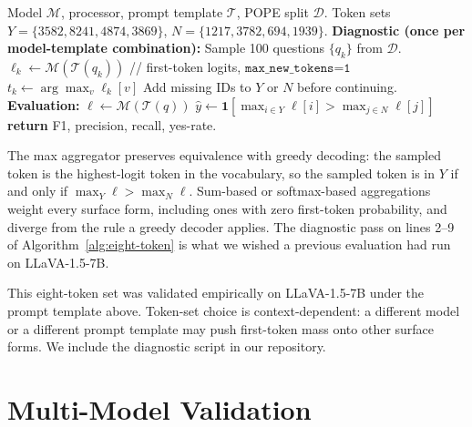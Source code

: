 \documentclass[11pt,letterpaper]{article}
\begin{document}
\begin{algorithm}[h]
\caption{Eight-token POPE read-out with new-model diagnostic.}
\label{alg:eight-token}
\begin{algorithmic}[1]
\REQUIRE Model $\mathcal{M}$, processor, prompt template $\mathcal{T}$, POPE split $\mathcal{D}$.
\REQUIRE Token sets $Y = \{3582, 8241, 4874, 3869\}$, $N = \{1217, 3782, 694, 1939\}$.
\STATE \textbf{Diagnostic (once per model-template combination):}
\STATE Sample 100 questions $\{q_k\}$ from $\mathcal{D}$.
  \STATE $\boldsymbol{\ell}_k \gets \mathcal{M}(\mathcal{T}(q_k))$ \quad // first-token logits, $\texttt{max\_new\_tokens=1}$
  \STATE $t_k \gets \arg\max_v \boldsymbol{\ell}_k[v]$
\ENDFOR
{}
  \STATE Add missing IDs to $Y$ or $N$ before continuing.
\ENDIF
\STATE \textbf{Evaluation:}
  \STATE $\boldsymbol{\ell} \gets \mathcal{M}(\mathcal{T}(q))$
  \STATE $\hat{y} \gets \mathbf{1}\!\left[\max_{i \in Y} \boldsymbol{\ell}[i] > \max_{j \in N} \boldsymbol{\ell}[j]\right]$
\ENDFOR
\STATE \textbf{return} F1, precision, recall, yes-rate.
\end{algorithmic}
\end{algorithm}

The max aggregator preserves equivalence with greedy decoding: the
sampled token is the highest-logit token in the vocabulary, so the
sampled token is in $Y$ if and only if $\max_Y \ell > \max_N \ell$.
Sum-based or softmax-based aggregations weight every surface form,
including ones with zero first-token probability, and diverge from the
rule a greedy decoder applies. The diagnostic pass on lines 2--9 of
Algorithm~\ref{alg:eight-token} is what we wished a previous evaluation
had run on LLaVA-1.5-7B.

This eight-token set was validated empirically on LLaVA-1.5-7B under
the prompt template above. Token-set choice is context-dependent: a
different model or a different prompt template may push first-token
mass onto other surface forms. We include the diagnostic script in our
repository.

\section{Multi-Model Validation}
\label{sec:crossmodel}
\end{document}
